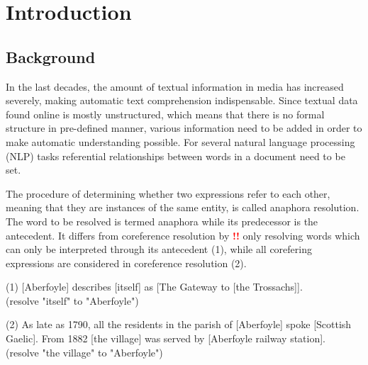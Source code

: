 \chapter{Introduction}
\label{sec:Introduction}

\section{Background}

In the last decades, the amount of textual information in media has increased severely, making automatic text comprehension indispensable. Since textual data found online is mostly unstructured, which means that there is no formal structure in pre-defined manner, various information need to be added in order to make automatic understanding possible. For several natural language processing (NLP) tasks referential relationships between words  in a document need to be set. 

The procedure of determining whether two expressions  refer to each other, meaning that they are instances of the same entity, is called anaphora resolution. The word to be resolved is termed anaphora while its predecessor is the antecedent. It differs from coreference resolution by \textcolor{red}{\textbf{!!}} only resolving words which can only be interpreted through its antecedent \citep{recasens2007anaphora} (1), while all corefering expressions are considered in coreference resolution (2).

(1) [Aberfoyle] describes [itself] as [The Gateway to [the Trossachs]]. \\
(resolve "itself" to "Aberfoyle")

(2) As late as 1790, all the residents in the parish of [Aberfoyle] spoke [Scottish Gaelic]. From 1882 [the village] was served by [Aberfoyle railway station].\\
(resolve "the village"  to "Aberfoyle")

